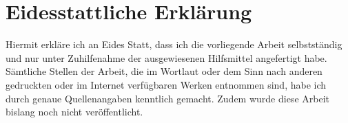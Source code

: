 \chapter*{Eidesstattliche Erklärung}
    Hiermit erkläre ich an Eides Statt, dass ich die vorliegende Arbeit selbstständig und nur unter Zuhilfenahme der ausgewiesenen Hilfsmittel angefertigt habe. Sämtliche Stellen der Arbeit, die im Wortlaut oder dem Sinn nach anderen gedruckten oder im Internet verfügbaren Werken entnommen sind, habe ich durch genaue Quellenangaben kenntlich gemacht. Zudem wurde diese Arbeit bislang noch nicht veröffentlicht.
